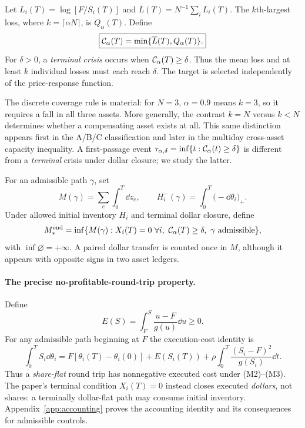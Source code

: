 \documentclass[review,hidelinks,onefignum,onetabnum]{siamonline250211}
\begin{document}
\begin{definition}\label{def:crash}
Let $L_i(T)=\log[F/S_i(T)]$ and $\overline L(T)=N^{-1}\sum_i L_i(T)$. The $k$th-largest loss, where $k=\lceil\alpha N\rceil$, is $Q_\alpha(T)$. Define
\begin{equation}\label{eq:crash}
\boxed{\mathcal{C}_\alpha(T)=\min\{\overline L(T),Q_\alpha(T)\}.}
\end{equation}
For $\delta>0$, a \emph{terminal crisis} occurs when $\mathcal{C}_\alpha(T)\ge\delta$. Thus the mean loss and at least $k$ individual losses must each reach $\delta$. The target is selected independently of the price-response function.
\end{definition}

The discrete coverage rule is material: for $N=3$, $\alpha=0.9$ means $k=3$, so it requires a fall in all three assets. More generally, the contrast $k=N$ versus $k<N$ determines whether a compensating asset exists at all. This same distinction appears first in the A/B/C classification and later in the multiday cross-asset capacity inequality. A first-passage event $\tau_{\alpha,\delta}=\inf\{t:\mathcal{C}_\alpha(t)\ge\delta\}$ is different from a \emph{terminal} crisis under dollar closure; we study the latter.

\begin{definition}\label{def:budget}
For an admissible path $\gamma$, set
\begin{equation}\label{eq:resource}
M(\gamma)=\sum_e\int_0^T\dd z_e,\qquad
H_i^-(\gamma)=\int_0^T\big(-\dd\theta_i\big)_+.
\end{equation}
Under allowed initial inventory $H_i$ and terminal dollar closure, define
\begin{equation}\label{eq:minbudget}
M_*^{\rm end}=\inf\{M(\gamma): X_i(T)=0\ \forall i,\ \Cris_\alpha(T)\ge\delta,\ \gamma\text{ admissible}\},
\end{equation}
with $\inf\varnothing=+\infty$. A paired dollar transfer is counted once in $M$, although it appears with opposite signs in two asset ledgers.
\end{definition}

\paragraph{The precise no-profitable-round-trip property.} Define
\begin{equation}\label{eq:E}
E(S)=\int_F^S\frac{u-F}{g(u)}\dd u\ge0.
\end{equation}
For any admissible path beginning at $F$ the execution-cost identity is
\begin{equation}\label{eq:cost}
\boxed{\int_0^T S_i\dd\theta_i=F[\theta_i(T)-\theta_i(0)]+E(S_i(T))
+\rho\int_0^T\frac{(S_i-F)^2}{g(S_i)}\dd t.}
\end{equation}
Thus a \emph{share-flat} round trip has nonnegative executed cost under (M2)--(M3). The paper's terminal condition $X_i(T)=0$ instead closes executed \emph{dollars}, not shares: a terminally dollar-flat path may consume initial inventory. Appendix~\ref{app:accounting} proves the accounting identity and its consequences for admissible controls.
\end{document}
